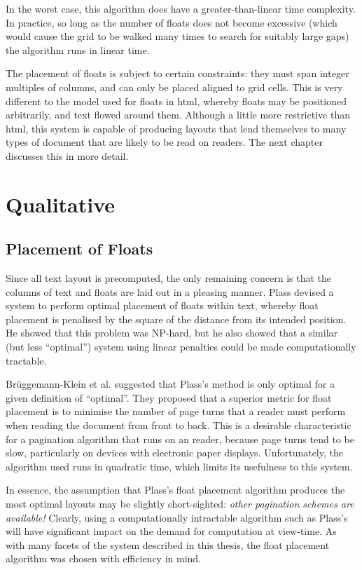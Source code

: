 In the worst case, this algorithm does have a greater-than-linear time complexity. In practice, so long as the number of floats does not become excessive (which would cause the grid to be walked many times to search for suitably large gaps) the algorithm runs in linear time.

The placement of floats is subject to certain constraints: they must span integer multiples of columns, and can only be placed aligned to grid cells. This is very different to the model used for floats in \gls{html}, whereby floats may be positioned arbitrarily, and text flowed around them. Although a little more restrictive than \gls{html}, this system is capable of producing layouts that lend themselves to many types of document that are likely to be read on \ebook{} readers. The next chapter discusses this in more detail.


\section{Qualitative}

\subsection{Placement of Floats}
Since all text layout is precomputed, the only remaining concern is that the columns of text and floats are laid out in a pleasing manner. Plass\hspace{0pt}\cite{Plass1981} devised a system to perform optimal placement of floats within text, whereby float placement is penalised by the square of the distance from its intended position. He showed that this problem was NP-hard, but he also showed that a similar (but less ``optimal'') system using linear penalties could be made computationally tractable.

Br\"uggemann-Klein et al.\hspace{0pt}\cite{Bruggemann-Klein1995} suggested that Plass's method is only optimal for a given definition of ``optimal''. They proposed that a superior metric for float placement is to minimise the number of page turns that a reader must perform when reading the document from front to back. This is a desirable characteristic for a pagination algorithm that runs on an \ebook{} reader, because page turns tend to be slow, particularly on devices with electronic paper displays. Unfortunately, the algorithm used runs in quadratic time, which limits its usefulness to this system.

In essence, the assumption that Plass's float placement algorithm produces the most optimal layouts may be slightly short-sighted: \emph{other pagination schemes are available!} Clearly, using a computationally intractable algorithm such as Plass's will have significant impact on the demand for computation at view-time. As with many facets of the system described in this thesis, the float placement algorithm was chosen with efficiency in mind.

